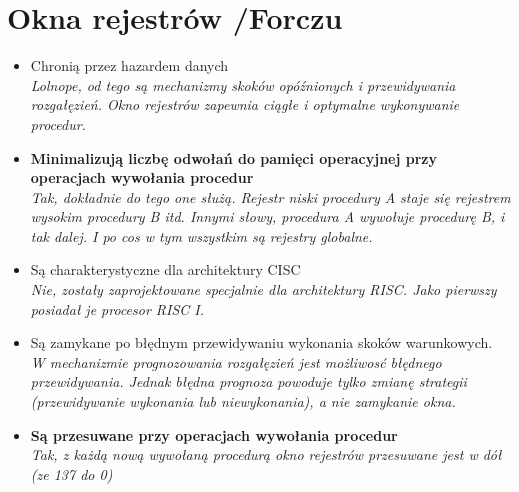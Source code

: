 \documentclass[a4paper,twoside]{article}
\begin{document}
\section{Okna rejestrów {\small /Forczu}}
	\begin{itemize}
    \item Chronią przez hazardem danych\\
    {\small \emph{Lolnope, od tego są mechanizmy skoków opóźnionych i przewidywania rozgałęzień. Okno rejestrów zapewnia ciągłe i optymalne wykonywanie procedur.}}
    \item \textbf{Minimalizują liczbę odwołań do pamięci operacyjnej przy operacjach wywołania procedur}\\
    {\small \emph{Tak, dokładnie do tego one służą. Rejestr niski procedury A staje się rejestrem wysokim procedury B itd. Innymi słowy, procedura A wywołuje procedurę B, i tak dalej. I po cos w tym wszystkim są rejestry globalne.}}
    \item Są charakterystyczne dla architektury CISC\\
    {\small \emph{Nie, zostały zaprojektowane specjalnie dla architektury RISC. Jako pierwszy posiadał je procesor RISC I.}}
    \item Są zamykane po błędnym przewidywaniu wykonania skoków warunkowych.\\
    {\small \emph{W mechanizmie prognozowania rozgałęzień jest możliwosć błędnego przewidywania. Jednak błędna prognoza powoduje tylko zmianę strategii (przewidywanie wykonania lub niewykonania), a nie zamykanie okna.}}
    \item \textbf{Są przesuwane przy operacjach wywołania procedur}\\
    {\small \emph{Tak, z każdą nową wywołaną procedurą okno rejestrów przesuwane jest w dół (ze 137 do 0)}}
    \end{itemize}
\end{document}
